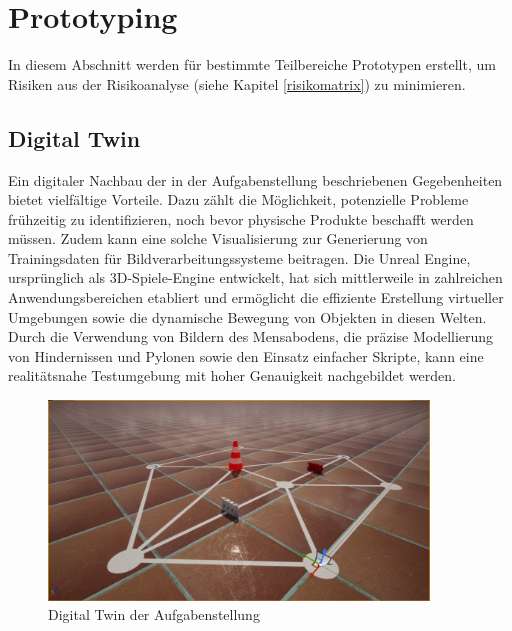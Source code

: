 \documentclass[../main.tex]{subfiles}
\begin{document}
\newpage
\section{Prototyping} \label{a4:prototyping}

In diesem Abschnitt werden für bestimmte Teilbereiche Prototypen erstellt,  
um Risiken aus der Risikoanalyse (siehe Kapitel \ref{risikomatrix}) zu minimieren.

\subsection{Digital Twin}
Ein digitaler Nachbau der in der Aufgabenstellung beschriebenen Gegebenheiten bietet vielfältige Vorteile. Dazu zählt die Möglichkeit, potenzielle Probleme frühzeitig zu identifizieren, noch bevor physische Produkte beschafft werden müssen. Zudem kann eine solche Visualisierung zur Generierung von Trainingsdaten für Bildverarbeitungssysteme beitragen. Die Unreal Engine, ursprünglich als 3D-Spiele-Engine entwickelt, hat sich mittlerweile in zahlreichen Anwendungsbereichen etabliert und ermöglicht die effiziente Erstellung virtueller Umgebungen sowie die dynamische Bewegung von Objekten in diesen Welten. Durch die Verwendung von Bildern des Mensabodens, die präzise Modellierung von Hindernissen und Pylonen sowie den Einsatz einfacher Skripte, kann eine realitätsnahe Testumgebung mit hoher Genauigkeit nachgebildet werden.

\begin{figure}[H]
    \centering
    \includegraphics[width=0.9\textwidth]{img/unrealengine/overview.png}
    \caption{Digital Twin der Aufgabenstellung}
\label{img:Übersicht Unreal Engine}
\end{figure}
\end{document}

